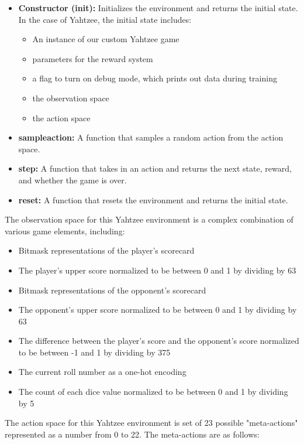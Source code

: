 \documentclass[12pt]{article}
\begin{document}
\begin{itemize}
    \item \textbf{Constructor (init):} Initializes the environment and returns the initial state. In the case of Yahtzee, the initial state includes:
    \begin{itemize}
        \item An instance of our custom Yahtzee game
        \item parameters for the reward system
        \item a flag to turn on debug mode, which prints out data during training
        \item the observation space
        \item the action space
    \end{itemize}
    \item \textbf{sample\textunderscore action:} A function that samples a random action from the action space.
    \item \textbf{step:} A function that takes in an action and returns the next state, reward, and whether the game is over.
    \item \textbf{reset:} A function that resets the environment and returns the initial state.
\end{itemize}

\noindent
The observation space for this Yahtzee environment is a complex combination of various game elements, including:

\begin{itemize}
    \item Bitmask representations of the player's scorecard
    \item The player's upper score normalized to be between 0 and 1 by dividing by 63
    \item Bitmask representations of the opponent's scorecard
    \item The opponent's upper score normalized to be between 0 and 1 by dividing by 63
    \item The difference between the player's score and the opponent's score normalized to be between -1 and 1 by dividing by 375
    \item The current roll number as a one-hot encoding
    \item The count of each dice value normalized to be between 0 and 1 by dividing by 5
\end{itemize}

\noindent
The action space for this Yahtzee environment is set of 23 possible "meta-actions" represented as a number from 0 to 22. The meta-actions are as follows:
\end{document}

